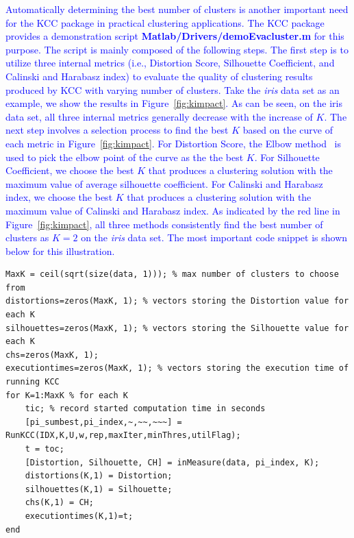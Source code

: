 \documentclass[10pt]{acmtrans2e}
\newcommand{\package}[1]{\textsf{#1}\xspace} %
\newcommand{\function}[1]{\textbf{\texttt{#1}}}
\begin{document}
\textcolor{blue}{Automatically determining the best number of clusters is another important need for the \package{KCC} package in practical clustering applications. The \package{KCC} package provides a demonstration script \textbf{Matlab/Drivers/demoEvacluster.m} for this purpose. The script is mainly composed of the following steps. The first step is to utilize three internal metrics (i.e., Distortion Score, Silhouette Coefficient, and Calinski and Harabasz index) to evaluate the quality of clustering results produced by KCC with varying number of clusters. Take the \textit{iris} data set as an example, we show the results in Figure~\ref{fig:kimpact}. As can be seen, on the iris data set, all three internal metrics generally decrease with the increase of $K$. The next step involves a selection process to find the best $K$ based on the curve of each metric in Figure~\ref{fig:kimpact}. For Distortion Score, the Elbow method~\cite{bholowalia2014ebk} is used to pick the elbow point of the curve as the the best $K$. For Silhouette Coefficient, we choose the best $K$ that produces a clustering solution with the maximum value of average silhouette coefficient. For Calinski and Harabasz index, we choose the best $K$ that produces a clustering solution with the maximum value of Calinski and Harabasz index. As indicated by the red line in Figure~\ref{fig:kimpact}, all three methods consistently find the best number of clusters as $K=2$ on the \textit{iris} data set. The most important code snippet is shown below for this illustration.}
\begin{lstlisting}[caption={Using \function{demoEvacluster.m} to determine the best number of clusters for \package{KCC}.},label=lst:findbestk]
MaxK = ceil(sqrt(size(data, 1))); % max number of clusters to choose from
distortions=zeros(MaxK, 1); % vectors storing the Distortion value for each K
silhouettes=zeros(MaxK, 1); % vectors storing the Silhouette value for each K
chs=zeros(MaxK, 1);
executiontimes=zeros(MaxK, 1); % vectors storing the execution time of running KCC
for K=1:MaxK % for each K
    tic; % record started computation time in seconds
    [pi_sumbest,pi_index,~,~~,~~~] = RunKCC(IDX,K,U,w,rep,maxIter,minThres,utilFlag);
    t = toc;
    [Distortion, Silhouette, CH] = inMeasure(data, pi_index, K);
    distortions(K,1) = Distortion;
    silhouettes(K,1) = Silhouette;
    chs(K,1) = CH;
    executiontimes(K,1)=t;
end
\end{lstlisting}

\end{document}
